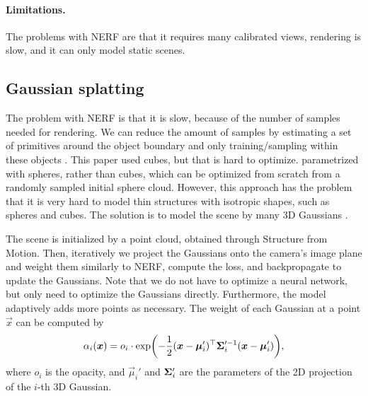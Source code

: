 \paragraph{Limitations.}

The problems with NERF are that it requires many calibrated views, rendering is slow, and it can
only model static scenes.

\subsection{Gaussian splatting}

The problem with NERF is that it is slow, because of the number of samples needed for rendering. We
can reduce the amount of samples by estimating a set of primitives around the object boundary and
only training/sampling within these objects \citep{lombardi2021mixture}. This paper used cubes, but
that is hard to optimize. \cite{lassner2021pulsar} parametrized with spheres, rather than cubes,
which can be optimized from scratch from a randomly sampled initial sphere cloud. However, this
approach has the problem that it is very hard to model thin structures with isotropic shapes, such
as spheres and cubes. The solution is to model the scene by many 3D Gaussians \citep{kerbl20233d}.

The scene is initialized by a point cloud, obtained through Structure from Motion. Then,
iteratively we project the Gaussians onto the camera's image plane and weight them similarly to
NERF, compute the loss, and backpropagate to update the Gaussians. Note that we do not have to
optimize a neural network, but only need to optimize the Gaussians directly. Furthermore, the model
adaptively adds more points as necessary. The weight of each Gaussian at a point $\vec{x}$ can be computed by \[
    \alpha_i(\vec{x}) = o_i \cdot \exp\lft(-\frac{1}{2} \transpose{(\vec{x} - \vec{\mu}_i')} \inv{\mat{\Sigma}_i'} (\vec{x} - \vec{\mu}_i')\rgt),
\]
where $o_i$ is the opacity, and $\vec{\mu}_i'$ and $\bm{\Sigma}_i'$ are the parameters of the 2D
projection of the $i$-th 3D Gaussian.

